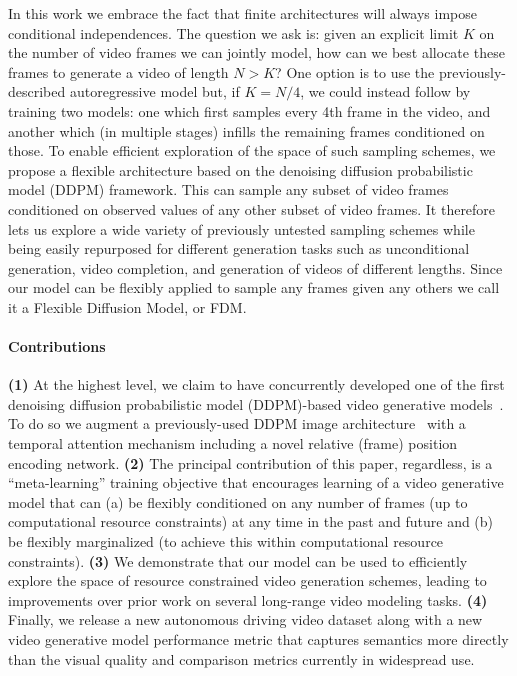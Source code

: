 In this work we embrace the fact that finite architectures will always impose conditional independences. The question we ask is: given an explicit limit $K$ on the number of video frames we can jointly model, how can we best allocate these frames to generate a video of length $N > K$? One option is to use the previously-described autoregressive model but, if $K=N/4$, we could instead follow \citet{ho2022video} by training two models: one which first samples every 4th frame in the video, and another which (in multiple stages) infills the remaining frames conditioned on those. To enable efficient exploration of the space of such sampling schemes, we propose a flexible architecture based on the denoising diffusion probabilistic model (DDPM) framework. This can sample any subset of video frames conditioned on observed values of any other subset of video frames. It therefore lets us explore a wide variety of previously untested sampling schemes while being easily repurposed for different generation tasks such as unconditional generation, video completion, and generation of videos of different lengths. Since our model can be flexibly applied to sample any frames given any others we call it a Flexible Diffusion Model, or FDM.

\paragraph{Contributions}
\textbf{(1)} At the highest level, we claim to have concurrently developed one of the first denoising diffusion probabilistic model (DDPM)-based video generative models~\cite{ho2022video,yang2022diffusion}. To do so we augment a previously-used DDPM image architecture~\cite{ho2020denoising,nichol2021improved} with a temporal attention mechanism including a novel relative (frame) position encoding network.  \textbf{(2)} The principal contribution of this paper, regardless, is a ``meta-learning'' training objective that encourages learning of a video generative model that can (a) be flexibly conditioned on any number of frames (up to computational resource constraints) at any time in the past and future and (b) be flexibly marginalized (to achieve this within computational resource constraints). \textbf{(3)} We demonstrate that our model can be used to efficiently explore the space of resource constrained video generation schemes, leading to improvements over prior work on several long-range video modeling tasks. \textbf{(4)} Finally, we release a new autonomous driving video dataset along with a new video generative model performance metric that captures semantics more directly than the visual quality and comparison metrics currently in widespread use.


